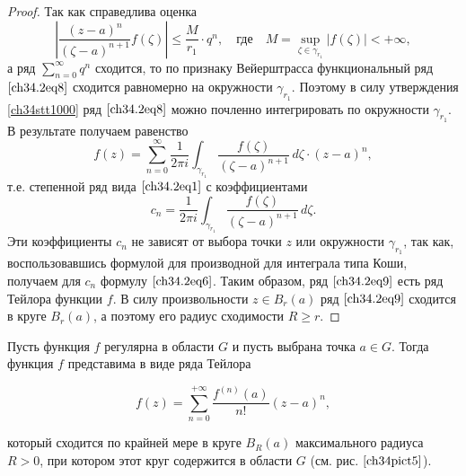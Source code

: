 \begin{proof}
Так как справедлива оценка
$$
\left| \frac{(z - a)^n}{(\zeta - a)^{n + 1}} f(\zeta) \right| \le \frac{M}{r_1} \cdot q^n, \quad \text{где} \quad M = \sup_{\zeta \in \gamma_{r_1}} |f(\zeta)| < +\infty,
$$
а ряд $\sum\limits_{n = 0}^{\infty} q^n$ сходится, то по признаку Вейерштрасса функциональный ряд $\eqref{ch34.2eq8}$ сходится равномерно на окружности $\gamma_{r_1}$. Поэтому в силу утверждения \ref{ch34stt1000} ряд $\eqref{ch34.2eq8}$ можно почленно интегрировать по окружности $\gamma_{r_1}$. В результате получаем равенство
\begin{equation} \label{ch34.2eq9}
f(z) = \sum\limits_{n = 0}^{\infty} \frac{1}{2\pi i} \int_{\gamma_{r_1}} \frac{f(\zeta)}{(\zeta - a)^{n + 1}} \,d\zeta \cdot (z - a)^n,
\end{equation}
т.е. степенной ряд вида $\eqref{ch34.2eq1}$ с коэффициентами
\begin{equation} \label{ch34.2eq10}
c_n = \frac{1}{2\pi i} \int_{\gamma_{r_1}} \frac{f(\zeta)}{(\zeta - a)^{n + 1}} \,d\zeta.
\end{equation}
Эти коэффициенты $c_n$ не зависят от выбора точки $z$ или окружности $\gamma_{r_1}$, так как, воспользовавшись формулой для производной для интеграла типа Коши, получаем для $c_n$ формулу $\eqref{ch34.2eq6}$. Таким образом, ряд $\eqref{ch34.2eq9}$ есть ряд Тейлора функции $f$. В силу произвольности $z \in B_r(a)$ ряд $\eqref{ch34.2eq9}$ сходится в круге $B_r(a)$, а поэтому его радиус сходимости $R \ge r$.
\end{proof}

\begin{cons} \label{cons1}
Пусть функция $f$ регулярна в области $G$ и пусть выбрана точка $a \in G$. Тогда функция $f$ представима в виде ряда Тейлора 

 \label{ch34pict5}
$$
f(z) = \sum\limits_{n = 0}^{+\infty} \frac{f^{(n)}(a)}{n!} (z - a)^n,
$$

который сходится по крайней мере в круге $B_R(a)$ максимального радиуса $R > 0$, при котором этот круг содержится в области $G$ (см. рис. $\ref{ch34pict5}$).
\end{cons}